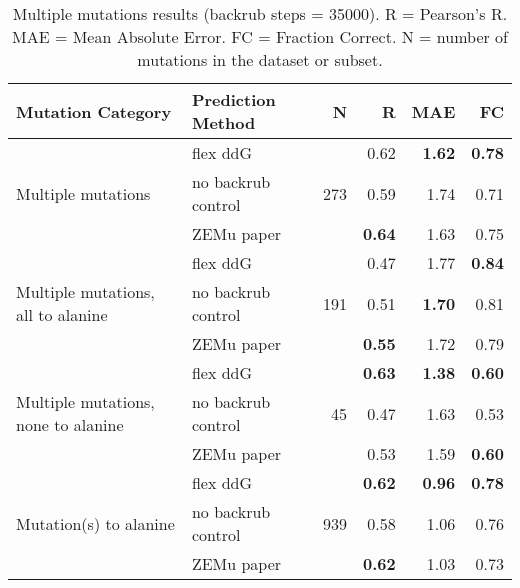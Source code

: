 \begin{table}
  \begin{tabular}{llrrrr}
\toprule
Mutation Category &   Prediction Method &    N &    R &  MAE &   FC \\
\midrule
 \multirow{ 3}{*}{Multiple mutations} & flex ddG & \multirow{ 3}{*}{273} & 0.62 & \textbf{1.62} & \textbf{0.78}  \\
 & no backrub control & & 0.59 & 1.74 & 0.71  \\
 & ZEMu paper & & \textbf{0.64} & 1.63 & 0.75  \\
\hline
 \multirow{ 3}{*}{Multiple mutations, all to alanine} & flex ddG & \multirow{ 3}{*}{191} & 0.47 & 1.77 & \textbf{0.84}  \\
 & no backrub control & & 0.51 & \textbf{1.70} & 0.81  \\
 & ZEMu paper & & \textbf{0.55} & 1.72 & 0.79  \\
\hline
 \multirow{ 3}{*}{Multiple mutations, none to alanine} & flex ddG & \multirow{ 3}{*}{45} & \textbf{0.63} & \textbf{1.38} & \textbf{0.60}  \\
 & no backrub control & & 0.47 & 1.63 & 0.53  \\
 & ZEMu paper & & 0.53 & 1.59 & \textbf{0.60}  \\
\hline
 \multirow{ 3}{*}{Mutation(s) to alanine} & flex ddG & \multirow{ 3}{*}{939} & \textbf{0.62} & \textbf{0.96} & \textbf{0.78}  \\
 & no backrub control & & 0.58 & 1.06 & 0.76  \\
 & ZEMu paper & & \textbf{0.62} & 1.03 & 0.73  \\
\bottomrule
\end{tabular}
  \caption[Multiple mutations results]{
    Multiple mutations results (backrub steps = 35000). R = Pearson's R. MAE = Mean Absolute Error. FC = Fraction Correct. N = number of mutations in the dataset or subset.
  } \label{tab:table-mult}
\end{table}
